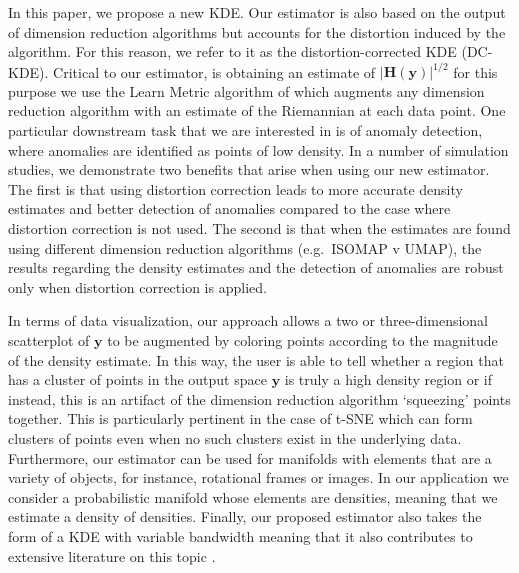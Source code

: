 \documentclass[11pt,a4paper,]{article}
\begin{document}
In this paper, we propose a new KDE. Our estimator is also based on the output of dimension reduction algorithms but accounts for the distortion induced by the algorithm. For this reason, we refer to it as the distortion-corrected KDE (DC-KDE). Critical to our estimator, is obtaining an estimate of \(|\pmb{H}(\pmb{y})|^{1/2}\) for this purpose we use the Learn Metric algorithm of \textcite{Perrault-Joncas2013-pq} which augments any dimension reduction algorithm with an estimate of the Riemannian at each data point. One particular downstream task that we are interested in is of anomaly detection, where anomalies are identified as points of low density. In a number of simulation studies, we demonstrate two benefits that arise when using our new estimator. The first is that using distortion correction leads to more accurate density estimates and better detection of anomalies compared to the case where distortion correction is not used. The second is that when the estimates are found using different dimension reduction algorithms (e.g.~ISOMAP v UMAP), the results regarding the density estimates and the detection of anomalies are robust only when distortion correction is applied.

In terms of data visualization, our approach allows a two or three-dimensional scatterplot of \(\pmb{y}\) to be augmented by coloring points according to the magnitude of the density estimate. In this way, the user is able to tell whether a region that has a cluster of points in the output space \(\pmb{y}\) is truly a high density region or if instead, this is an artifact of the dimension reduction algorithm `squeezing' points together. This is particularly pertinent in the case of t-SNE which can form clusters of points even when no such clusters exist in the underlying data. Furthermore, our estimator can be used for manifolds with elements that are a variety of objects, for instance, rotational frames or images. In our application we consider a probabilistic manifold whose elements are densities, meaning that we estimate a density of densities. Finally, our proposed estimator also takes the form of a KDE with variable bandwidth meaning that it also contributes to extensive literature on this topic \autocite[see Section 6.6 of][ for a summary]{Scott2015-vl}.
\end{document}

